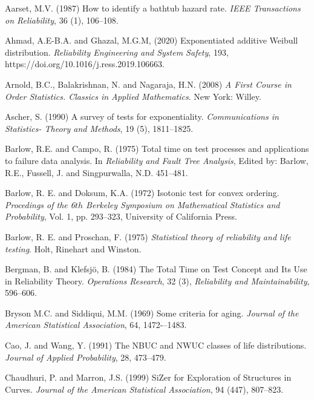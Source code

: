 \documentclass[preprint,12pt]{elsarticle}
\begin{document}
\begin{thebibliography}{}

 Aarset, M.V. (1987) How to identify a bathtub hazard rate. {\it IEEE Transactions on Reliability}, 36 (1), 106--108.

 Ahmad, A.E-B.A. and Ghazal, M.G.M, (2020) Exponentiated additive Weibull distribution. {\it Reliability Engineering and System Safety}, 193, https://doi.org/10.1016/j.ress.2019.106663.

 Arnold, B.C., Balakrishnan, N. and Nagaraja, H.N. (2008) \textit{A First Course in Order Statistics. Classics in Applied Mathematics}. New York: Willey. 

 Ascher, S. (1990) A survey of tests for exponentiality. {\it Communications in Statistics- Theory and Methods}, 19 (5), 1811--1825.

 Barlow, R.E. and Campo, R. (1975) Total time on test processes and applications to failure data analysis. In \textit{Reliability and Fault Tree Analysis}, Edited by: Barlow, R.E., Fussell, J. and Singpurwalla, N.D. 451--481.

 Barlow, R. E. and Doksum, K.A. (1972) Isotonic test for convex ordering. \textit{Procedings of the 6$th$ Berkeley Symposium on Mathematical Statistics and Probability}, Vol. 1, pp. 293--323, University of California Press.

 Barlow, R. E. and Proschan, F. (1975) \textit{Statistical theory of reliability and life testing}. Holt, Rinehart and Winston.

 Bergman, B. and Klefsjö, B. (1984) The Total Time on Test Concept and Its Use in Reliability Theory. \textit{Operations Research}, 32 (3), \textit{Reliability and Maintainability},  596--606.


  Bryson M.C. and Siddiqui, M.M. (1969) Some criteria for aging. \textit{Journal of the American Statistical Association},  64, 1472-–1483. 

 Cao, J. and Wang, Y. (1991) The NBUC and NWUC classes of life distributions. \textit{Journal of Applied Probability}, 28, 473--479.

 Chaudhuri, P. and Marron, J.S. (1999)  SiZer for Exploration of Structures in Curves. \textit{Journal of the American Statistical Association}, 94 (447),  807--823.


\end{thebibliography}
\end{document}
